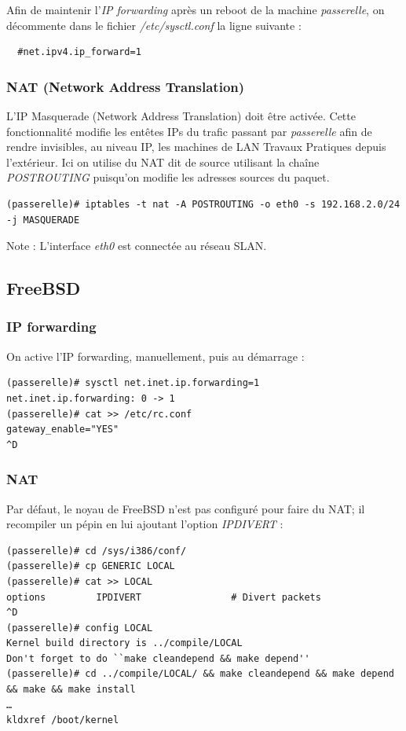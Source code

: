 \documentclass[a4paper]{article}
\begin{document}
Afin de maintenir l'\textit{IP forwarding} après un reboot de la machine
\textit{passerelle}, on décommente dans le fichier \textit{/etc/sysctl.conf}
la ligne suivante :
\begin{verbatim}
  #net.ipv4.ip_forward=1
\end{verbatim}

\subsubsection{NAT (Network Address Translation)}
L'IP Masquerade (Network Address Translation) doit être
activée. Cette fonctionnalité modifie les entêtes IPs du trafic
passant par \textit{passerelle} afin de rendre invisibles, au niveau IP,
les machines de LAN Travaux Pratiques depuis l'extérieur.
Ici on utilise du NAT dit de source utilisant la chaîne 
\textit{POSTROUTING} puisqu'on modifie les adresses sources du paquet.
\begin{verbatim}
(passerelle)# iptables -t nat -A POSTROUTING -o eth0 -s 192.168.2.0/24 -j MASQUERADE
\end{verbatim}

Note : L'interface \textit{eth0} est connectée au réseau SLAN.
\subsection{FreeBSD}
\subsubsection{IP forwarding}
On active l'IP forwarding, manuellement, puis au démarrage :
\begin{verbatim}
(passerelle)# sysctl net.inet.ip.forwarding=1
net.inet.ip.forwarding: 0 -> 1
(passerelle)# cat >> /etc/rc.conf
gateway_enable="YES"
^D
\end{verbatim}

\subsubsection{NAT}
Par défaut, le noyau de FreeBSD n'est pas configuré pour faire
du NAT; il recompiler un pépin en lui ajoutant l'option \textit{IPDIVERT} :
\begin{verbatim}
(passerelle)# cd /sys/i386/conf/
(passerelle)# cp GENERIC LOCAL
(passerelle)# cat >> LOCAL
options         IPDIVERT                # Divert packets
^D
(passerelle)# config LOCAL
Kernel build directory is ../compile/LOCAL
Don't forget to do ``make cleandepend && make depend''
(passerelle)# cd ../compile/LOCAL/ && make cleandepend && make depend && make && make install
…
kldxref /boot/kernel
\end{verbatim}
\end{document}
